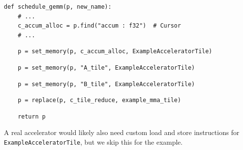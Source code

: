 \begin{minipage}[t]{0.5\textwidth}
{\begin{verbatim}
def schedule_gemm(p, new_name):
    # ...
    c_accum_alloc = p.find("accum : f32")  # Cursor
    # ...
\end{verbatim}
\begin{mdframed}[style=MyFrame, backgroundcolor=violetBoxBg]
\color{violetBoxFg}
\begin{verbatim}
    p = set_memory(p, c_accum_alloc, ExampleAcceleratorTile)
\end{verbatim}
\end{mdframed}
\begin{mdframed}[style=MyFrame, backgroundcolor=yellowBoxBg]
\color{yellowBoxFg}
\begin{verbatim}
    p = set_memory(p, "A_tile", ExampleAcceleratorTile)
\end{verbatim}
\end{mdframed}
\begin{mdframed}[style=MyFrame, backgroundcolor=greenBoxBg]
\color{greenBoxFg}
\begin{verbatim}
    p = set_memory(p, "B_tile", ExampleAcceleratorTile)
\end{verbatim}
\end{mdframed}
\begin{mdframed}[style=MyFrame, backgroundcolor=blueBoxBg]
\color{blueBoxFg}
\begin{verbatim}
    p = replace(p, c_tile_reduce, example_mma_tile)
\end{verbatim}
\end{mdframed}
\begin{verbatim}
    return p
\end{verbatim}
}
\vspace{6mm}
A real accelerator would likely also need custom load and store instructions for \texttt{ExampleAcceleratorTile}, but we skip this for the example.
\end{minipage}
\newpage
{}













